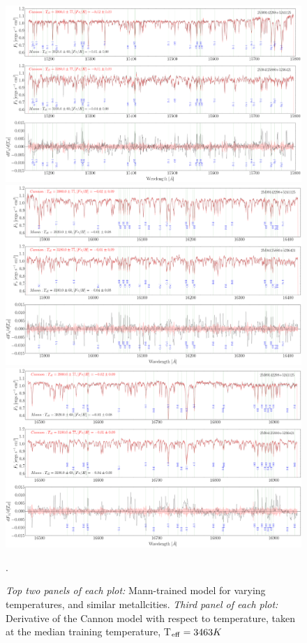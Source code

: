 \documentclass[modern]{aastex62}
\begin{document}
\begin{figure}[ht]
\begin{center}
\includegraphics[width=16cm]{figures/demo_derivatives_teff1.png}
\includegraphics[width=16cm]{figures/demo_derivatives_teff2.png}
\includegraphics[width=16cm]{figures/demo_derivatives_teff3.png}
\end{center}
\caption{\textit{Top two panels of each plot:} Mann-trained model for varying temperatures, and similar metallcities. \textit{Third panel of each plot:} Derivative of the Cannon model with respect to temperature, taken at the median training temperature, T$_{\rm eff}=3463 K$}. \label{fig:demo_teff}
\end{figure}
\end{document}
